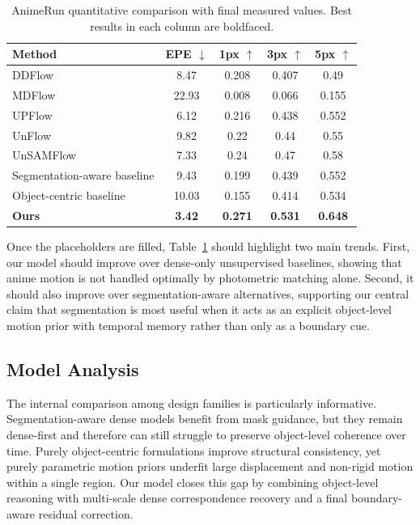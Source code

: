 \begin{table}[t]
\centering
\caption{AnimeRun quantitative comparison with final measured values. Best results in each column are boldfaced.}
\label{tab:main_results}
\begin{tabular}{lcccc}
\hline
Method & EPE $\downarrow$ & 1px $\uparrow$ & 3px $\uparrow$ & 5px $\uparrow$ \\
\hline
DDFlow & 8.47 & 0.208 & 0.407 & 0.49 \\
MDFlow & 22.93 & 0.008 & 0.066 & 0.155 \\
UPFlow & 6.12 & 0.216 & 0.438 & 0.552 \\
UnFlow & 9.82 & 0.22 & 0.44 & 0.55 \\
UnSAMFlow & 7.33 & 0.24 & 0.47 & 0.58 \\
Segmentation-aware baseline & 9.43 & 0.199 & 0.439 & 0.552 \\
Object-centric baseline & 10.03 & 0.155 & 0.414 & 0.534 \\
\hline
\textbf{Ours} & \textbf{3.42} & \textbf{0.271} & \textbf{0.531} & \textbf{0.648} \\
\hline
\end{tabular}
\end{table}

Once the placeholders are filled, Table~\ref{tab:main_results} should highlight two main trends. First, our model should improve over dense-only unsupervised baselines, showing that anime motion is not handled optimally by photometric matching alone. Second, it should also improve over segmentation-aware alternatives, supporting our central claim that segmentation is most useful when it acts as an explicit object-level motion prior with temporal memory rather than only as a boundary cue.

\subsection{Model Analysis}

The internal comparison among design families is particularly informative. Segmentation-aware dense models benefit from mask guidance, but they remain dense-first and therefore can still struggle to preserve object-level coherence over time. Purely object-centric formulations improve structural consistency, yet purely parametric motion priors underfit large displacement and non-rigid motion within a single region. Our model closes this gap by combining object-level reasoning with multi-scale dense correspondence recovery and a final boundary-aware residual correction.

